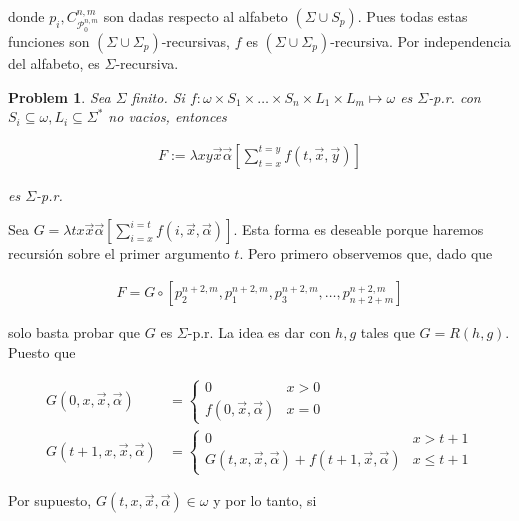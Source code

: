 \documentclass[a4paper, 12pt]{article}
\newtheorem{problem}{Problem}
\newtheorem{problem}{Problem}
\begin{document}
donde $p_i, C_{\mathcal{P}_0^{n, m}}^{n, m}$ son dadas respecto al alfabeto $(\Sigma
\cup S_p)$. Pues todas estas funciones son $(\Sigma \cup \Sigma_p)$-recursivas, $f$ es $(\Sigma
\cup \Sigma_p)$-recursiva. Por independencia del alfabeto, es $\Sigma$-recursiva.

\pagebreak 

\begin{problem}
    Sea $\Sigma$ finito. Si $f : \omega \times S_1 \times  \ldots \times S_n
    \times L_1 \times L_m \mapsto \omega$ es $\Sigma$-p.r. con $S_i \subseteq
    \omega, L_i \subseteq \Sigma^{*}$ no vacios, entonces 

    \begin{align*}
        F := \lambda xy \vec{x}\vec{\alpha} \left[ \sum_{t=x}^{t=y} f(t, \vec{x},
        \vec{y})  \right]
    \end{align*}

    es $\Sigma$-p.r. 
\end{problem}

Sea $G = \lambda tx \vec{x}\vec{\alpha} \left[ \sum_{i = x}^{i = t} f(i,
\vec{x}, \vec{\alpha})  \right]$. Esta forma es deseable porque haremos
recursión sobre el primer argumento $t$. Pero primero observemos que, dado que

\begin{align*}
    F = G \circ \left[ p_2^{n+2, m}, p_{1}^{n+2, m}, p_3^{n+2, m}, \ldots, p_{n
    + 2 + m}^{n+2, m} \right] 
\end{align*}

solo basta probar que $G$ es $\Sigma$-p.r. La idea es dar con $h, g$ tales que
$G = R(h, g)$. Puesto que

\begin{align*}
    G(0, x, \vec{x}, \vec{\alpha}) &= \begin{cases}
        0 & x > 0 \\ 
        f(0, \vec{x}, \vec{\alpha}) & x = 0
    \end{cases} \\ 
        G(t + 1, x, \vec{x}, \vec{\alpha}) &= \begin{cases}
            0 & x > t + 1 \\ 
            G(t, x, \vec{x}, \vec{\alpha}) + f(t + 1, \vec{x}, \vec{\alpha}) & x
            \leq t+1
        \end{cases}
\end{align*}

Por supuesto, $G(t, x, \vec{x}, \vec{\alpha}) \in \omega$ y por lo tanto, si
\end{document}
